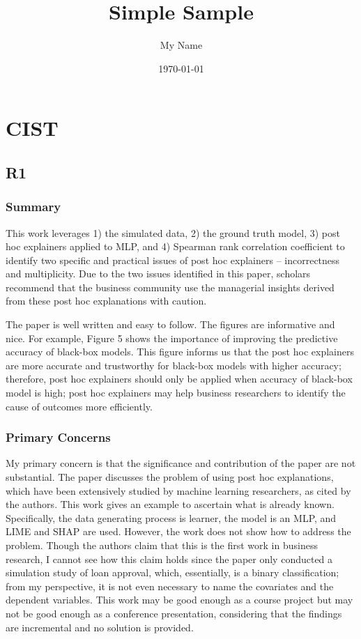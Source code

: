 \documentclass{article} %
\title{Simple Sample} %
\author{My Name} %
\date{\today} %
\begin{document}
    \maketitle %
    
\section{CIST}
    \subsection{R1}
    \subsubsection{Summary}
    This work leverages 1) the simulated data, 2) the ground truth model, 3) post hoc explainers applied to MLP, and 4) Spearman rank correlation coefficient to identify two specific and practical issues of post hoc explainers – incorrectness and multiplicity. Due to the two issues identified in this paper, scholars recommend that the business community use the managerial insights derived from these post hoc explanations with caution.

The paper is well written and easy to follow. The figures are informative and nice. For example, Figure 5 shows the importance of improving the predictive accuracy of black-box models. This figure informs us that the post hoc explainers are more accurate and trustworthy for black-box models with higher accuracy; therefore, post hoc explainers should only be applied when accuracy of black-box model is high; post hoc explainers may help business researchers to identify the cause of outcomes more efficiently.

    \subsubsection{Primary Concerns}

My primary concern is that the significance and contribution of the paper are not substantial. The paper discusses the problem of using post hoc explanations, which have been extensively studied by machine learning researchers, as cited by the authors. This work gives an example to ascertain what is already known. Specifically, the data generating process is learner, the model is an MLP, and LIME and SHAP are used. However, the work does not show how to address the problem. Though the authors claim that this is the first work in business research, I cannot see how this claim holds since the paper only conducted a simulation study of loan approval, which, essentially, is a binary classification; from my perspective, it is not even necessary to name the covariates and the dependent variables. This work may be good enough as a course project but may not be good enough as a conference presentation, considering that the findings are incremental and no solution is provided.
\end{document}
